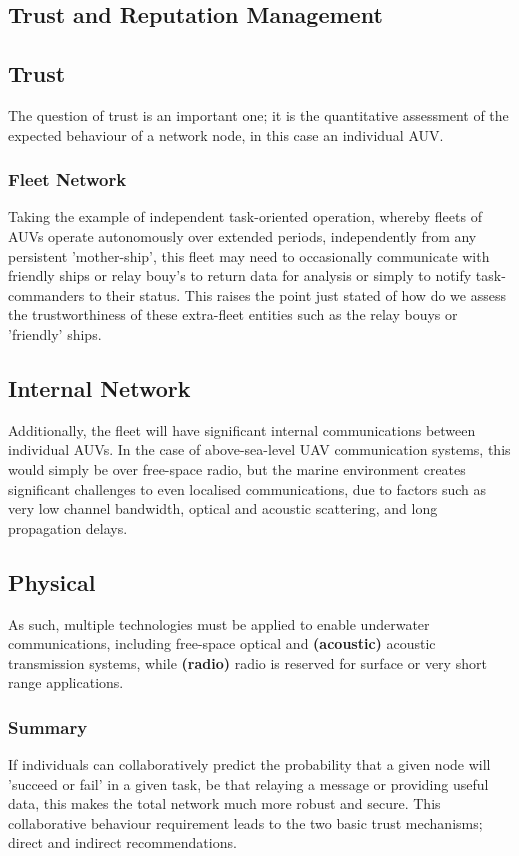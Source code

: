 \documentclass[oneside,11pt,a4paper]{Latex/Classes/PhDthesisPSnPDF}
\begin{document}
\begin{doublespace}
\section{Trust and Reputation Management}
\subsection{Trust}  The question of trust is an important one; it is the quantitative
assessment of the expected behaviour of a network node, in this case an
individual AUV. 

\subsubsection{Fleet Network}  
Taking the example of independent task-oriented operation, whereby fleets of
AUVs operate autonomously over extended periods, independently from any
persistent 'mother-ship', this fleet may need to occasionally communicate with
friendly ships or relay bouy's to return data for analysis or simply to notify
task-commanders to their status. This raises the point just stated of how do we
assess the trustworthiness of these extra-fleet entities such as the relay bouys
or 'friendly' ships.

\subsection{Internal Network}
Additionally, the fleet will have significant internal communications between
individual AUVs. In the case of above-sea-level UAV communication systems, this
would simply be over free-space radio, but the marine environment creates
significant challenges to even localised communications, due to factors such as
very low channel bandwidth, optical and acoustic scattering, and long
propagation delays.

\subsection{Physical}
As such, multiple technologies must be applied to enable underwater
communications, including free-space optical and \textbf{(acoustic)} acoustic
transmission systems, while \textbf{(radio)} radio is reserved for surface or
very short range applications. 

\subsubsection{Summary} 
If individuals can collaboratively predict
the probability that a given node will 'succeed or fail' in a given task, be that relaying a message
or providing useful data, this makes the total network much more robust and
secure. This collaborative behaviour requirement leads to the two basic trust
mechanisms; direct and indirect recommendations. 


\end{doublespace}
\end{document}
